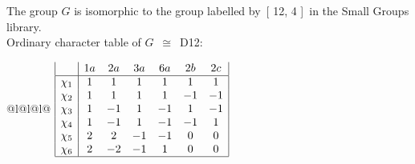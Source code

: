 \documentclass[varwidth=\maxdimen,border=10]{standalone}
\begin{document}
The group $G$ is isomorphic to the group labelled by\ [ 12, 4 ]\ in the Small Groups library.\\
Ordinary character table of $G$\ $\cong$\ D12:\\
\begin{center}
\begin{tabular}{@{}l@{}l@{}l@{}}
\hline
\(\begin{array}{|l|cccccc|}
  & 1a & 2a & 3a & 6a & 2b & 2c\\ \hline
\chi_{1} & 1 & 1 & 1 & 1 & 1 & 1\\
\chi_{2} & 1 & 1 & 1 & 1 & -1 & -1\\
\chi_{3} & 1 & -1 & 1 & -1 & 1 & -1\\
\chi_{4} & 1 & -1 & 1 & -1 & -1 & 1\\
\chi_{5} & 2 & 2 & -1 & -1 & 0 & 0\\
\chi_{6} & 2 & -2 & -1 & 1 & 0 & 0\\
\hline
\end{array}\)\\
\end{tabular}
\end{center}
\end{document}
